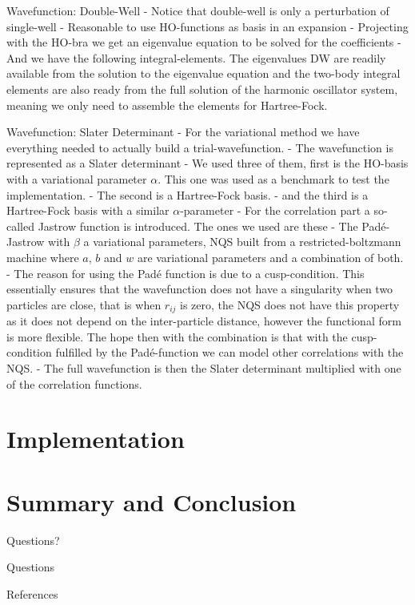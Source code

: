 \documentclass[10pt]{beamer}
\begin{document}
\begin{frame}[fragile]{Wavefunction: Double-Well}
    - Notice that double-well is only a perturbation of single-well
    - Reasonable to use HO-functions as basis in an expansion
    - Projecting with the HO-bra we get an eigenvalue equation to be solved for
    the coefficients
    - And we have the following integral-elements. The eigenvalues DW are
    readily available from the solution to the eigenvalue equation and the
    two-body integral elements are also ready from the full solution of the
    harmonic oscillator system, meaning we only need to assemble the elements
    for Hartree-Fock.
\end{frame}

\begin{frame}[fragile]{Wavefunction: Slater Determinant}
    - For the variational method we have everything needed to actually build a
    trial-wavefunction.
    - The wavefunction is represented as a Slater determinant
    - We used three of them, first is the HO-basis with a variational parameter
    $\alpha$. This one was used as a benchmark to test the implementation.
    - The second is a Hartree-Fock basis.
    - and the third is a Hartree-Fock basis with a similar $\alpha$-parameter
    - For the correlation part a so-called Jastrow function is introduced. The
    ones we used are these
    - The Pad\'e-Jastrow with $\beta$ a variational parameters, NQS built from
    a restricted-boltzmann machine where $a$, $b$ and $w$ are variational
    parameters and a combination of both.
    - The reason for using the Pad\'e function is due to a cusp-condition. This
    essentially ensures that the wavefunction does not have a singularity when
    two particles are close, that is when $r_{ij}$ is zero, the NQS does not
    have this property as it does not depend on the inter-particle distance,
    however the functional form is more flexible. The hope then with the
    combination is that with the cusp-condition fulfilled by the
    Pad\'e-function we can model other correlations with the NQS.
    - The full wavefunction is then the Slater determinant multiplied with one
    of the correlation functions.
\end{frame}

\section{Implementation}
\section{Summary and Conclusion}

{
\begin{frame}[standout]
  Questions?
\end{frame}
}

\appendix

\begin{frame}[fragile]{Questions}
\end{frame}

\begin{frame}[allowframebreaks]{References}

  
  

\end{frame}
\end{document}
